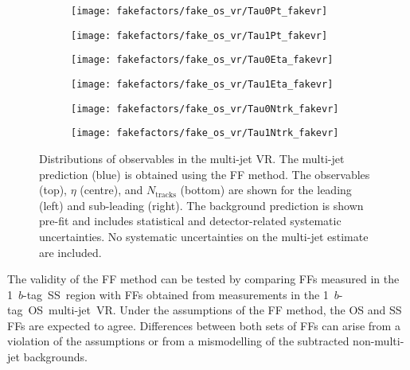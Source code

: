 \begin{figure}[htbp]
  \centering

  \begin{subfigure}{0.44\textwidth}
    \texttt{[image: fakefactors/fake\_os\_vr/Tau0Pt\_fakevr]}
  \end{subfigure}\hspace*{0.04\textwidth}%
  \begin{subfigure}{0.44\textwidth}
    \texttt{[image: fakefactors/fake\_os\_vr/Tau1Pt\_fakevr]}
  \end{subfigure}

  \begin{subfigure}{0.44\textwidth}
    \texttt{[image: fakefactors/fake\_os\_vr/Tau0Eta\_fakevr]}
  \end{subfigure}\hspace*{0.04\textwidth}%
  \begin{subfigure}{0.44\textwidth}
    \texttt{[image: fakefactors/fake\_os\_vr/Tau1Eta\_fakevr]}
  \end{subfigure}

  \begin{subfigure}{0.44\textwidth}
    \texttt{[image: fakefactors/fake\_os\_vr/Tau0Ntrk\_fakevr]}
  \end{subfigure}\hspace*{0.04\textwidth}%
  \begin{subfigure}{0.44\textwidth}
    \texttt{[image: fakefactors/fake\_os\_vr/Tau1Ntrk\_fakevr]}
  \end{subfigure}

  \caption[Distributions of \tauhadvis observables in the multi-jet
  VR.]{Distributions of \tauhadvis observables in the multi-jet VR. The
    multi-jet prediction (blue) is obtained using the FF method. The \tauhadvis
    observables \pT (top), $\eta$ (centre), and $N_{\text{tracks}}$ (bottom) are
    shown for the leading (left) and sub-leading \tauhadvis (right). The
    background prediction is shown pre-fit and includes statistical and
    detector-related systematic uncertainties. No systematic uncertainties on
    the multi-jet estimate are included.}%
  \label{fig:fake_factor_OSVR_kinematics}
\end{figure}

The validity of the FF method can be tested by comparing FFs measured in the
1~$b$-tag~SS~region with FFs obtained from measurements in the
1~$b$-tag~OS~multi-jet~VR. Under the assumptions of the FF method, the OS and SS
FFs are expected to agree. Differences between both sets of FFs can arise from a
violation of the assumptions or from a mismodelling of the subtracted
non-multi-jet backgrounds.


